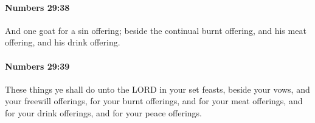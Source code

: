 		\paragraph{Numbers 29:38} %
			\label{NUMBERS-29-38}

			And one goat for a sin offering; beside the continual burnt offering, and his meat offering, and his drink offering.


		\paragraph{Numbers 29:39} %
			\label{NUMBERS-29-39}

			These things ye shall do unto the LORD in your set feasts, beside your vows, and your freewill offerings, for your burnt offerings, and for your meat offerings, and for your drink offerings, and for your peace offerings.



